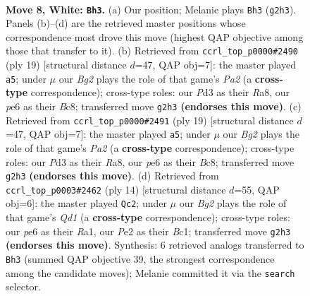 \documentclass[11pt]{article}
\begin{document}
\begin{figure}[p]\centering
\begin{subfigure}{0.46\textwidth}\centering
\resizebox{\linewidth}{!}{%
\newchessgame
\chessboard[
  setfen={rnbq1rk1/pp2bpp1/4pn2/2pp3p/7P/3P1NP1/PPPNPPB1/R1BQ1RK1 w - - 0 8},
  showmover=false,
  pgfstyle=straightmove, color=movearrow, markmove={g2-h3}
]}
\caption{}
\end{subfigure}\hfill
\begin{subfigure}{0.46\textwidth}\centering
\resizebox{\linewidth}{!}{%
\newchessgame
\chessboard[
  setfen={r1b2rk1/p1qnppbp/2pp1np1/1p6/3PP3/3BBN1P/PPPQNPP1/R4RK1 b - - 0 10},
  showmover=false,
  pgfstyle=straightmove, color=movearrow, markmove={a7-a5}
]}
\caption{}
\end{subfigure}
\\[4pt]
\begin{subfigure}{0.46\textwidth}\centering
\resizebox{\linewidth}{!}{%
\newchessgame
\chessboard[
  setfen={r1b2rk1/p1qnppbp/2pp1np1/1p6/3PP3/3BBN1P/PPPQNPP1/R4RK1 b - - 0 10},
  showmover=false,
  pgfstyle=straightmove, color=movearrow, markmove={a7-a5}
]}
\caption{}
\end{subfigure}\hfill
\begin{subfigure}{0.46\textwidth}\centering
\resizebox{\linewidth}{!}{%
\newchessgame
\chessboard[
  setfen={rnbq1rk1/pp2b1pp/2p1pn2/3p1p2/2PP4/5NP1/PP1NPPBP/R1BQ1RK1 w - - 0 8},
  showmover=false,
  pgfstyle=straightmove, color=movearrow, markmove={d1-c2}
]}
\caption{}
\end{subfigure}
\caption{\textbf{Move 8, White: \texttt{Bh3}.} (a) Our position; Melanie plays \texttt{Bh3} (\texttt{g2h3}). Panels (b)--(d) are the retrieved master positions whose correspondence most drove this move (highest QAP objective among those that transfer to it). (b) Retrieved from \texttt{ccrl\_top\_p0000\#2490} (ply 19) [structural distance $d$=47, QAP obj=7]: the master played \texttt{a5}; under $\mu$ our \emph{Bg2} plays the role of that game's \emph{Pa2} (a \textbf{cross-type} correspondence); cross-type roles: our \emph{P}d3 as their \emph{R}a8, our \emph{p}e6 as their \emph{B}c8; transferred move \texttt{g2h3} \textbf{(endorses this move)}. (c) Retrieved from \texttt{ccrl\_top\_p0000\#2491} (ply 19) [structural distance $d$=47, QAP obj=7]: the master played \texttt{a5}; under $\mu$ our \emph{Bg2} plays the role of that game's \emph{Pa2} (a \textbf{cross-type} correspondence); cross-type roles: our \emph{P}d3 as their \emph{R}a8, our \emph{p}e6 as their \emph{B}c8; transferred move \texttt{g2h3} \textbf{(endorses this move)}. (d) Retrieved from \texttt{ccrl\_top\_p0003\#2462} (ply 14) [structural distance $d$=55, QAP obj=6]: the master played \texttt{Qc2}; under $\mu$ our \emph{Bg2} plays the role of that game's \emph{Qd1} (a \textbf{cross-type} correspondence); cross-type roles: our \emph{p}e6 as their \emph{R}a1, our \emph{P}e2 as their \emph{B}c1; transferred move \texttt{g2h3} \textbf{(endorses this move)}. Synthesis: 6 retrieved analogs transferred to \texttt{Bh3} (summed QAP objective 39, the strongest correspondence among the candidate moves); Melanie committed it via the \texttt{search} selector.}
\label{fig:thought-m14}
\end{figure}
\end{document}
